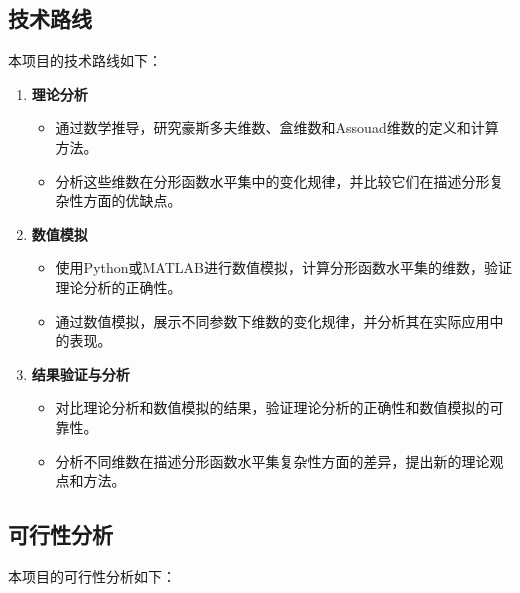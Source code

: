 \subsection{技术路线}
\label{sec:technical_route}

本项目的技术路线如下：

\begin{enumerate}
      \item \textbf{理论分析}
      \begin{itemize}
            \item 通过数学推导，研究豪斯多夫维数、盒维数和Assouad维数的定义和计算方法。
            \item 分析这些维数在分形函数水平集中的变化规律，并比较它们在描述分形复杂性方面的优缺点。
      \end{itemize}
      \item \textbf{数值模拟}
      \begin{itemize}
            \item 使用Python或MATLAB进行数值模拟，计算分形函数水平集的维数，验证理论分析的正确性。
            \item 通过数值模拟，展示不同参数下维数的变化规律，并分析其在实际应用中的表现。
      \end{itemize}
      \item \textbf{结果验证与分析}
      \begin{itemize}
            \item 对比理论分析和数值模拟的结果，验证理论分析的正确性和数值模拟的可靠性。
            \item 分析不同维数在描述分形函数水平集复杂性方面的差异，提出新的理论观点和方法。
      \end{itemize}
\end{enumerate}

\subsection{可行性分析}
\label{sec:feasibility_analysis}

本项目的可行性分析如下：

